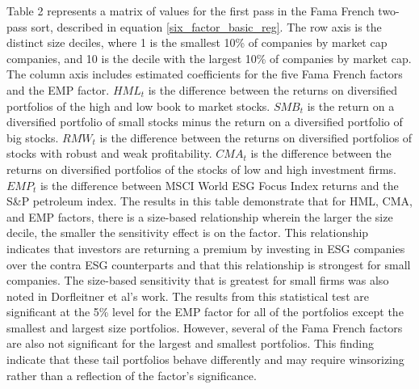 Table 2 represents a matrix of values for the first pass in the Fama French two-pass sort, described in equation \eqref{six_factor_basic_reg}. The row axis is the distinct size deciles, where 1 is the smallest 10\% of companies by market cap companies, and 10 is the decile with the largest 10\% of companies by market cap. The column axis includes estimated coefficients for the five Fama French factors and the EMP factor. $HML_{t}$ is the difference between the returns on diversified portfolios of the high and low book to market stocks.  $SMB_{t}$ is the return on a diversified portfolio of small stocks minus the return on a diversified portfolio of big stocks. $RMW_t$ is the difference between the returns on diversified portfolios of stocks with robust and weak profitability. $CMA_{t}$ is the difference between the returns on diversified portfolios of the stocks of low and high investment firms. $EMP_t$ is the difference between MSCI World ESG Focus Index returns and the S\&P petroleum index. The results in this table demonstrate that for HML, CMA, and EMP factors, there is a size-based relationship wherein the larger the size decile, the smaller the sensitivity effect is on the factor.  This relationship indicates that investors are returning a premium by investing in ESG companies over the contra ESG counterparts and that this relationship is strongest for small companies.  The size-based sensitivity that is greatest for small firms was also noted in Dorfleitner et al's work\cite{Dorfleitner2020ESGCA}. The results from this statistical test are significant at the 5\% level for the EMP factor for all of the portfolios except the smallest and largest size portfolios. However, several of the Fama French factors are also not significant for the largest and smallest portfolios. This finding indicate that these tail portfolios  behave differently and may require winsorizing rather than a reflection of the factor's significance. 


